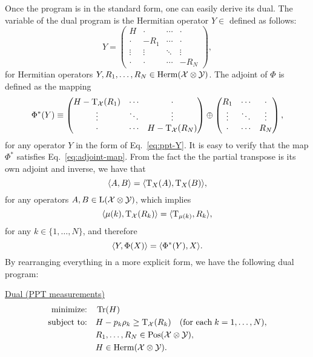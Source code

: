 Once the program is in the standard form, one can easily derive its dual.
The variable of the dual program is the Hermitian operator
$Y \in $ 
defined as follows:
\begin{equation}
\label{eq:ppt-Y}
  Y = 
  \begin{pmatrix}
      H & \cdot & \cdots & \cdot \\
        \cdot  & -R_{1} & \cdots & \cdot\\
        \vdots & \vdots & \ddots & \vdots\\
        \cdot  & \cdot & \cdots & -R_{N}
    \end{pmatrix},
\end{equation}
for Hermitian operators $Y, R_{1}, \ldots, R_{N} \in \mathrm{Herm}(\mathcal{X}\otimes\mathcal{Y})$.
The adjoint of $\Phi$ is defined as the mapping
\begin{equation}
  \Phi^{\ast}(Y) \equiv 
    \begin{pmatrix}
      H - \operatorname{T}_{\mathcal{X}}(R_{1}) & \cdots & \cdot\\
      \vdots & \ddots & \vdots\\
      \cdot & \cdots & H - \operatorname{T}_{\mathcal{X}}(R_{N})\\
    \end{pmatrix}
    \oplus
    \begin{pmatrix}
      R_{1} & \cdots & \cdot\\
      \vdots & \ddots & \vdots\\
      \cdot & \cdots & R_{N}\\
    \end{pmatrix},
\end{equation}
for any operator $Y$ in the form of Eq.~\eqref{eq:ppt-Y}.
It is easy to verify that the map $\Phi^{\ast}$ satisfies Eq.~\eqref{eq:adjoint-map}.
From the fact the the partial transpose is its own adjoint and inverse, we have 
that
\begin{equation}
  \langle A , B\rangle = \langle \operatorname{T}_{X}(A) , \operatorname{T}_{X}(B)\rangle,
\end{equation}
for any operators $A, B\in\mathrm{L}(\mathcal{X}\otimes\mathcal{Y})$, which implies
\begin{equation}
\langle \mu(k) , \operatorname{T}_{\mathcal{X}}(R_{k})\rangle = \langle \operatorname{T}_{\mu(k)} , R_{k}\rangle,
\end{equation}
for any $k \in \{1, \ldots, N\}$, and therefore
\begin{equation}
  \langle Y , \Phi(X)\rangle = \langle \Phi^{\ast}(Y) , X\rangle.
\end{equation}
By rearranging everything in a more explicit form, we have the following dual program:
\begin{center}
\underline{Dual (PPT measurements)}
\begin{equation}
  \label{eq:ppt-dual-problem}
  \begin{split}
    \text{minimize:} \quad & \operatorname{Tr}(H)\\
    \text{subject to:} \quad & H-p_k\rho_k \geq \operatorname{T}_{\mathcal{X}}(R_{k})
    \quad(\text{for each}\;k = 1,\ldots,N),\\
    \quad & R_{1}, \ldots, R_{N} \in \mathrm{Pos}(\mathcal{X}\otimes\mathcal{Y}),\\
    \quad & H \in \mathrm{Herm}(\mathcal{X}\otimes\mathcal{Y}).
  \end{split}
\end{equation}
\end{center}

